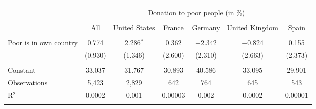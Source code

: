 
\begin{tabular}{@{\extracolsep{5pt}}lcccccc} 
\\[-1.8ex]\hline 
\hline \\[-1.8ex] 
 & \multicolumn{6}{c}{Donation to poor people (in \%)} \\ 
\cline{2-7} 
\\[-1.8ex] & All & United States & France & Germany & United Kingdom & Spain \\ 
\hline \\[-1.8ex] 
 Poor is in own country & 0.774 & 2.286$^{*}$ & 0.362 & $-$2.342 & $-$0.824 & 0.155 \\ 
  & (0.930) & (1.346) & (2.600) & (2.310) & (2.663) & (2.373) \\ 
 \hline \\[-1.8ex] 
Constant & 33.037 & 31.767 & 30.893 & 40.586 & 33.095 & 29.901 \\ 
Observations & 5,423 & 2,829 & 642 & 764 & 645 & 543 \\ 
R$^{2}$ & 0.0002 & 0.001 & 0.00003 & 0.002 & 0.0002 & 0.00001 \\ 
\hline 
\hline \\[-1.8ex] 
\end{tabular} 